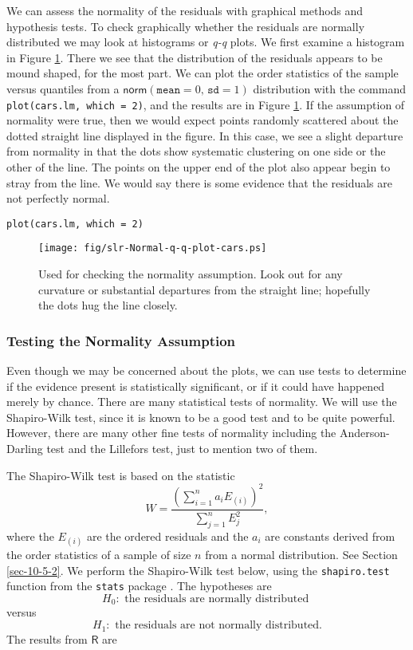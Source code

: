 We can assess the normality of the residuals with graphical methods
and hypothesis tests. To check graphically whether the residuals are
normally distributed we may look at histograms or \emph{q-q} plots. We
first examine a histogram in Figure \ref{fig-Normal-q-q-plot-cars}. There we see
that the distribution of the residuals appears to be mound shaped, for
the most part. We can plot the order statistics of the sample versus
quantiles from a \(\mathsf{norm}(\mathtt{mean}=0,\,\mathtt{sd}=1)\)
distribution with the command \texttt{plot(cars.lm, which = 2)}, and the
results are in Figure \ref{fig-Normal-q-q-plot-cars}. If the assumption of
normality were true, then we would expect points randomly scattered
about the dotted straight line displayed in the figure. In this case,
we see a slight departure from normality in that the dots show
systematic clustering on one side or the other of the line. The points
on the upper end of the plot also appear begin to stray from the
line. We would say there is some evidence that the residuals are not
perfectly normal.

\begin{verbatim}
plot(cars.lm, which = 2)
\end{verbatim}

\begin{figure}[ht!]
\centering
\texttt{[image: fig/slr-Normal-q-q-plot-cars.ps]}
\caption[Normal q-q plot of the residuals for the \texttt{cars} data]{\label{fig-Normal-q-q-plot-cars}\small Used for checking the normality assumption. Look out for any curvature or substantial departures from the straight line; hopefully the dots hug the line closely.}
\end{figure}

\subsubsection{Testing the Normality Assumption}
\label{sec-11-4-1-1}

Even though we may be concerned about the plots, we can use tests to
determine if the evidence present is statistically significant, or if
it could have happened merely by chance. There are many statistical
tests of normality. We will use the Shapiro-Wilk test, since it is
known to be a good test and to be quite powerful. However, there are
many other fine tests of normality including the Anderson-Darling test
and the Lillefors test, just to mention two of them.

The Shapiro-Wilk test is based on the statistic
\begin{equation}
W=\frac{\left(\sum_{i=1}^{n}a_{i}E_{(i)}\right)^{2}}{\sum_{j=1}^{n}E_{j}^{2}},
\end{equation}
where the \(E_{(i)}\) are the ordered residuals and the \(a_{i}\) are
constants derived from the order statistics of a sample of size \(n\)
from a normal distribution. See Section \ref{sec-10-5-2}.
We perform the Shapiro-Wilk test below, using the \texttt{shapiro.test}
function from the \texttt{stats} package \cite{stats}. The hypotheses are \[
H_{0}:\mbox{ the residuals are normally distributed } \] versus \[
H_{1}:\mbox{ the residuals are not normally distributed.}  \] The
results from \(\mathsf{R}\) are

